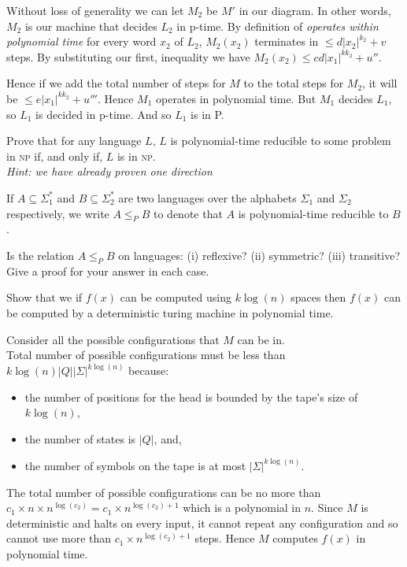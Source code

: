 Without loss of generality we can let $M_2$ be $M'$ in our diagram. 
In other words, $M_2$ is our machine that decides $L_2$ in p-time. 
By definition of \textit{operates within polynomial time} for every word $x_2$ of $L_2$,
$M_2(x_2)$ terminates in $\leqslant d|x_2|^{k_2} + v$ steps.
By substituting our first, inequality we have $M_2(x_2) \leqslant cd|x_1|^{k k_2} + u''$. 

Hence if we add the total number of steps for $M$ to the total steps for $M_2$, 
it will be $\leqslant e|x_1|^{k k_2} + u'''$. Hence $M_1$ operates in polynomial time. 
But $M_1$ decides $L_1$, so $L_1$ is decided in p-time. And so $L_1$ is in P.

\frmrule

\begin{example}
Prove that for any language $L$, $L$ is polynomial-time reducible to some problem
in \textsc{np} if, and only if, $L$ is in \textsc{np}.
\\ \textit{Hint: we have already proven one direction}
\end{example}

\frmrule

\begin{example}
If  $A \subseteq \Sigma^{*}_1$ and $B \subseteq \Sigma^{*}_2$
are two languages over the alphabets $\Sigma_1$ and $\Sigma_2$ respectively,
we write $A \leqslant_P B$ to denote that $A$ is polynomial-time reducible to $B$.

Is the relation $A \leqslant_P B$ on languages:
(i) reflexive? (ii) symmetric? (iii) transitive?
Give a proof for your answer in each case.
\end{example}

\frmrule

\begin{example}
Show that we if $f(x)$ can be computed using $k\log(n)$ spaces then $f(x)$
can be computed by a deterministic turing machine in polynomial time.

Consider all the possible configurations that $M$ can be in.\\
Total number of possible configurations must be less than $k\log(n)|Q||\Sigma|^{k\log(n)}$ because:
\begin{itemize}   
\renewcommand{\labelitemi}{$\Box$}
\item the number of positions for the head is bounded by the tape's size of $k\log(n)$,
\item the number of states is $|Q|$, and,
\item the number of symbols on the tape is at most $|\Sigma|^{k\log(n)}$.
\end{itemize}
The total number of possible configurations can be no more
than  $c_1 \times n \times n^{\log(c_2)} = c_1 \times n^{\log(c_2) + 1}$
which is a polynomial in $n$. Since $M$ is deterministic and halts on 
every input, it cannot repeat any configuration and so cannot use more 
than $c_1 \times n^{\log(c_2) + 1}$ steps. Hence $M$ computes $f(x)$ in polynomial time.
\end{example}


